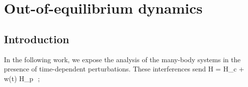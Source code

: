 \chapter{Out-of-equilibrium dynamics}

%
\section{Introduction}

In the following work, we expose the analysis of the many-body systems in the presence of time-dependent perturbations. These interferences send 
	H = H_c + w(t) H_p \,\,;
\ea











